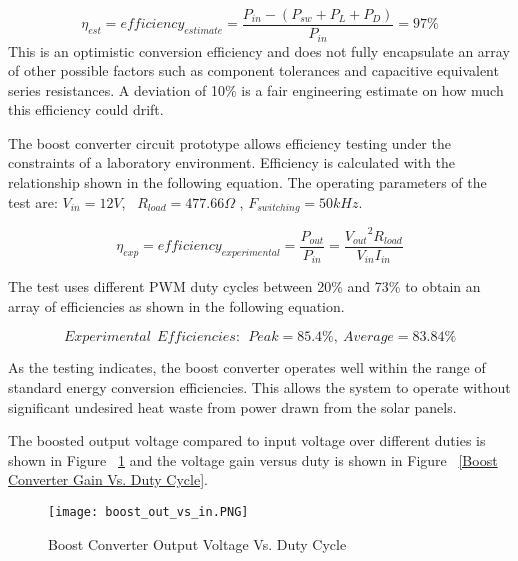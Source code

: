 \begin{equation}
\eta_{est} = efficiency_{estimate} = \frac{P_{in} - {(P_{sw}+P_L+P_D)}}{P_{in}} = 97\%
\end{equation}
This is an optimistic conversion efficiency and does not fully encapsulate an array of other possible factors such as component tolerances and capacitive equivalent series resistances. A deviation of 10\% is a fair engineering estimate on how much this efficiency could drift.

The boost converter circuit prototype allows efficiency testing under the constraints of a laboratory environment. Efficiency is calculated with the relationship shown in the following equation. The operating parameters of the test are: $V_{in} = 12V$,~ $R_{load} = 477.66\Omega$ , $F_{switching} = 50 kHz$. 

\begin{equation}
\eta_{exp} = efficiency_{experimental} = \frac{P_{out}}{P_{in}} = \frac{{V_{out}}^2{R_{load}}}{{V_{in}}{I_{in}}}
\end{equation}

The test uses different PWM duty cycles between 20\% and 73\% to obtain an array of efficiencies as shown in the following equation.

\begin{equation}
Experimental~~ Efficiencies:  ~~  Peak = 85.4\%, ~ Average = 83.84\% 
\end{equation}

As the testing indicates, the boost converter operates well within the range of standard energy conversion efficiencies. This allows the system to operate without significant undesired heat waste from power drawn from the solar panels.

The boosted output voltage compared to input voltage over different duties is shown in Figure ~\ref{Boost Converter Output Voltage Vs. Duty Cycle} and the voltage gain versus duty is shown in Figure ~\ref{Boost Converter Gain Vs. Duty Cycle}.

\begin{figure}
\centering
\texttt{[image: boost\_out\_vs\_in.PNG]}
\caption{Boost Converter Output Voltage Vs. Duty Cycle}
\label{Boost Converter Output Voltage Vs. Duty Cycle}
\end{figure}

